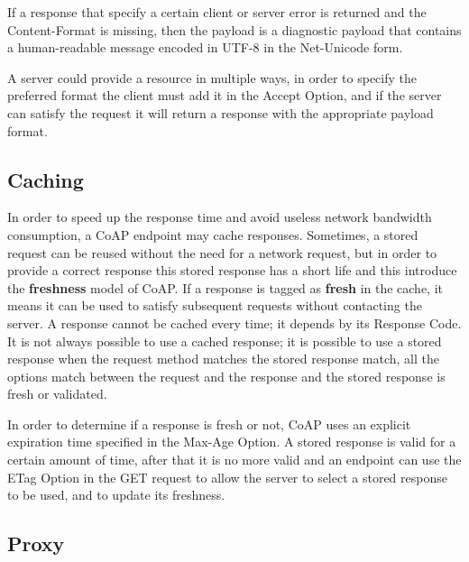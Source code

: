 	If a response that specify a certain client or server error is returned and the Content-Format is missing, then the payload is a diagnostic payload that contains a human-readable message encoded in UTF-8 in the Net-Unicode form.\newline
	
	A server could provide a resource in multiple ways, in order to specify the preferred format the client must add it in the Accept Option, and if the server can satisfy the request it will return a response with the appropriate payload format.\newline
	
	\subsection{Caching}
	In order to speed up the response time and avoid useless network bandwidth consumption, a CoAP endpoint may cache responses.\newline
	Sometimes, a stored request can be reused without the need for a network request, but in order to provide a correct response this stored response has a short life and this introduce the \textbf{freshness} model of CoAP.\newline
	If a response is tagged as \textbf{fresh} in the cache, it means it can be used to satisfy subsequent requests without contacting the server.\newline
	A response cannot be cached every time; it depends by its Response Code.\newline
	It is not always possible to use a cached response; it is possible to use a stored response when the request method matches the stored response match, all the options match between the request and the response and the stored response is fresh or validated.\newline
	
	In order to determine if a response is fresh or not, CoAP uses an explicit expiration time specified in the Max-Age Option.\newline
	A stored response is valid for a certain amount of time, after that it is no more valid and an endpoint can use the ETag Option in the GET request to allow the server to select a stored response to be used, and to update its freshness.\newline
	
	\subsection{Proxy}
	
